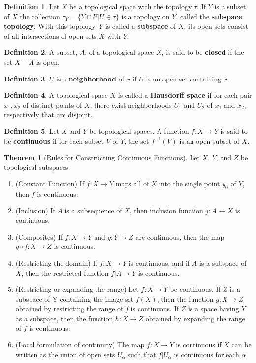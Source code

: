 \documentclass{article}
\theoremstyle{definition}
\newtheorem{definition}{Definition}[section]
\newtheorem{theorem}{Theorem}[section]
\begin{document}
\begin{definition}
    Let $X$ be a topological space with the topology $\tau$. If $Y$ is a subset of $X$ the collection $\tau_Y = \{Y \cap U | U \in \tau\}$ is a topology on $Y$, called the \textbf{subspace topology}. With this topology, $Y$ is called a \textbf{subspace} of $X$; its open sets consist of all intersections of open sets $X$ with $Y$.
\end{definition}
\begin{definition}
    A subset, $A$, of a topological space $X$, is said to be \textbf{closed} if the set $X - A$ is open.
\end{definition}
\begin{definition}
    $U$ is a \textbf{neighborhood} of $x$ if $U$ is an open set containing $x$.
\end{definition}
\begin{definition}
    A topological space $X$ is called a \textbf{Hausdorff space} if for each pair $x_1, x_2$ of distinct points of $X$, there exist neighborhoods $U_1$ and $U_2$ of $x_1$ and $x_2$, respectively that are disjoint.
\end{definition}
\begin{definition}
    Let $X$ and $Y$ be topological spaces. A function $f: X \rightarrow Y$ is said to be \textbf{continuous} if for each subset $V$ of $Y$, the set $f^{-1}(V)$ is an open subset of $X$.
\end{definition}
\begin{theorem}[Rules for Constructing Continuous Functions]
    Let $X$, $Y$, and $Z$ be topological subspaces
    \begin{enumerate}
        \item(Constant Function) If $f: X \rightarrow Y$ maps all of $X$ into the single point $y_0$ of $Y$, then $f$ is continuous.
        \item(Inclusion) If $A$ is a subsequence of $X$, then inclusion function $j: A \rightarrow X$ is continuous.
        \item(Composites) If $f: X \rightarrow Y$ and $g: Y \rightarrow Z$ are continuous, then the map $g \circ f: X \rightarrow Z$ is continuous.
        \item(Restricting the domain) If $f: X \rightarrow Y$ is continuous, and if $A$ is a subspace of $X$, then the restricted function $f|A \rightarrow Y$ is continuous.
        \item(Restricting or expanding the range) Let $f: X \rightarrow Y$ be continuous. If $Z$ is a subspace of Y containing the image set $f(X)$, then the function $g: X \rightarrow Z$ obtained by restricting the range of $f$ is continuous. If $Z$ is a space having $Y$ as a subspace, then the function $h: X \rightarrow Z$ obtained by expanding the range of $f$ is continuous.
        \item(Local formulation of continuity) The map $f: X \rightarrow Y$ is continuous if $X$ can be written as the union of open sets $U_{\alpha}$ such that $f|U_{\alpha}$ is continuous for each $\alpha$.
    \end{enumerate}
\end{theorem}
\end{document}

